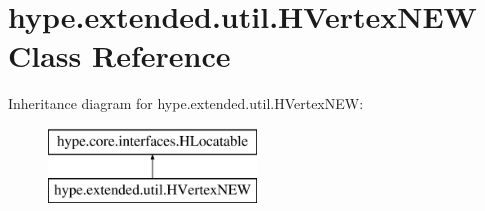 \hypertarget{classhype_1_1extended_1_1util_1_1_h_vertex_n_e_w}{\section{hype.\-extended.\-util.\-H\-Vertex\-N\-E\-W Class Reference}
\label{classhype_1_1extended_1_1util_1_1_h_vertex_n_e_w}
}
Inheritance diagram for hype.\-extended.\-util.\-H\-Vertex\-N\-E\-W\-:\begin{figure}[H]
\begin{center}
\leavevmode
\includegraphics[height=2.000000cm]{classhype_1_1extended_1_1util_1_1_h_vertex_n_e_w}
\end{center}
\end{figure}
